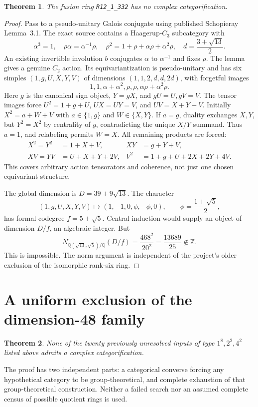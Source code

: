 \documentclass[11pt]{article}
\newtheorem{theorem}{Theorem}
\newcommand{\R}[1]{\texttt{R12\_1\_#1}}
\newcommand{\Z}{\mathbb Z}
\newcommand{\Q}{\mathbb Q}
\begin{document}
\begin{theorem}
The fusion ring \R{332} has no complex categorification.
\end{theorem}
\begin{proof}
Pass to a pseudo-unitary Galois conjugate using published Schopieray
Lemma~3.1. The exact source contains a Haagerup-$C_3$ subcategory with
\[
 \alpha^3=1,\quad \rho\alpha=\alpha^{-1}\rho,\quad
 \rho^2=1+\rho+\alpha\rho+\alpha^2\rho,\quad
 d=\frac{3+\sqrt{13}}2.
\]
An existing invertible involution $b$ conjugates $\alpha$ to
$\alpha^{-1}$ and fixes $\rho$. The lemma gives a genuine $C_2$ action.
Its equivariantization is pseudo-unitary and has six simples
$(1,g,U,X,Y,V)$ of dimensions $(1,1,2,d,d,2d)$, with forgetful images
\[
 1,1,\alpha+\alpha^2,\rho,\rho,\alpha\rho+\alpha^2\rho.
\]
Here $g$ is the canonical sign object, $Y=gX$, and $gU=U,gV=V$.
The tensor images force $U^2=1+g+U$, $UX=UY=V$, and
$UV=X+Y+V$. Initially
$X^2=a+W+V$ with $a\in\{1,g\}$ and $W\in\{X,Y\}$.
If $a=g$, duality exchanges $X,Y$, but $Y^2=X^2$ by centrality of $g$,
contradicting the unique $X/Y$ summand. Thus $a=1$, and relabeling permits
$W=X$. All remaining products are forced:
\begin{align*}
 X^2=Y^2&=1+X+V,& XY&=g+Y+V,\\
 XV=YV&=U+X+Y+2V,&
 V^2&=1+g+U+2X+2Y+4V.
\end{align*}
This covers arbitrary action tensorators and coherence, not just one
chosen equivariant structure.

The global dimension is $D=39+9\sqrt{13}$. The character
\[
 (1,g,U,X,Y,V)\longmapsto(1,-1,0,\phi,-\phi,0),
 \qquad\phi=\frac{1+\sqrt5}{2},
\]
has formal codegree $f=5+\sqrt5$. Central induction would supply an
object of dimension $D/f$, an algebraic integer. But
\[
 N_{\Q(\sqrt{13},\sqrt5)/\Q}(D/f)
 =\frac{468^2}{20^2}=\frac{13689}{25}\notin\Z.
\]
This is impossible. The norm argument is independent of the project's
older exclusion of the isomorphic rank-six ring.
\end{proof}

\section{A uniform exclusion of the dimension-48 family}
\begin{theorem}
None of the twenty previously unresolved inputs of type $1^8,2^2,4^2$
listed above admits a complex categorification.
\end{theorem}
The proof has two independent parts: a categorical converse forcing any
hypothetical category to be group-theoretical, and complete exhaustion of
that group-theoretical construction. Neither a failed search nor an assumed
complete census of possible quotient rings is used.
\end{document}
